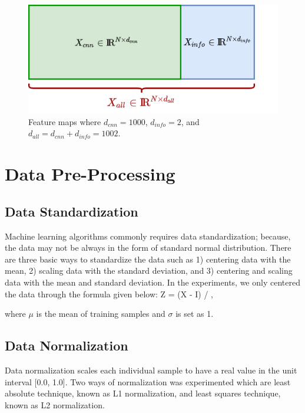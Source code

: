 \begin{figure}[h]
    \centering
    \includegraphics[width=.6\linewidth]{fig/feature_maps.png}
    \vspace{2mm}
    \caption{Feature maps where $d_{cnn} = 1000$, $d_{info} = 2$, and $d_{all} = d_{cnn} + d_{info} = 1002$.}
    \label{fig:feature_maps}
\end{figure}

\section{Data Pre-Processing}

\subsection{Data Standardization}

Machine learning algorithms commonly requires data standardization; because, the data may not be always in the form of standard normal distribution. There are three basic ways to standardize the data such as 1) centering data with the mean, 2) scaling data with the standard deviation, and 3) centering and scaling data with the mean and standard deviation. In the experiments, we only centered the data through the formula given below:
\be
\label{eq:data_standardization}
Z = (X - \mu * I) / \sigma\:,
\ee

where $\mu$ is the mean of training samples and $\sigma$ is set as 1. 


\subsection{Data Normalization}

Data normalization scales each individual sample to have a real value in the unit interval [0.0, 1.0]. Two ways of normalization was experimented which are least absolute technique, known as L1 normalization, and least squares technique, known as L2 normalization.

